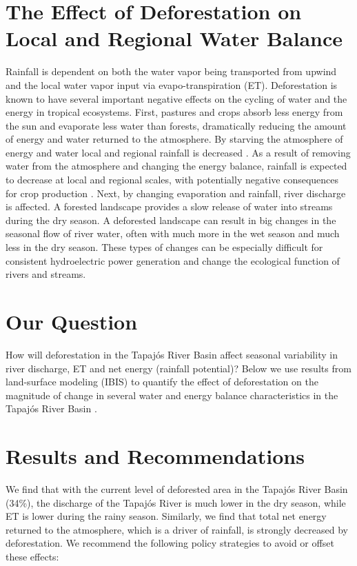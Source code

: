 \documentclass[DIV=calc, paper=a4, fontsize=11pt, twocolumn]{scrartcl}	 %
\begin{document}

\section*{The Effect of Deforestation on Local and Regional Water Balance}
Rainfall is dependent on both the water vapor being transported from upwind and the local water vapor input via evapo-transpiration (ET). Deforestation is known to have several important negative effects on the cycling of water and the energy in tropical ecosystems. First, pastures and crops absorb less energy from the sun and evaporate less water than forests, dramatically reducing the amount of energy and water returned to the atmosphere. By starving the atmosphere of energy and water local and regional rainfall is decreased \cite{coe2009influence}. As a result of removing water from the atmosphere and changing the energy balance, rainfall is expected to decrease at local and regional scales, with potentially negative consequences for crop production \cite{oliveira2013large}. Next, by changing evaporation and rainfall, river discharge is affected. A forested landscape provides a slow release of water into streams during the dry season. A deforested landscape can result in big changes in the seasonal flow of river water, often with much more in the wet season and much less in the dry season. These types of changes can be especially difficult for consistent hydroelectric power generation and change the ecological function of rivers and streams\cite{coe2011effects}. 

\section*{Our Question}
How will deforestation in the Tapaj\'{o}s River Basin affect seasonal variability in river discharge, ET and net energy (rainfall potential)? Below we use results from land-surface modeling (IBIS) to quantify the effect of deforestation on the magnitude of change in several water and energy balance characteristics in the Tapaj\'{o}s River Basin \cite{coe2009influence}.
\section*{Results and Recommendations}
We find that with the current level of deforested area in the Tapaj\'{o}s River Basin (34\%),  the discharge of the Tapaj\'{o}s River is much lower in the dry season, while ET is lower during the rainy season. Similarly, we find that total net energy returned to the atmosphere, which is a driver of rainfall, is strongly decreased by deforestation. We recommend the following policy strategies to avoid or offset these effects:
\end{document}
